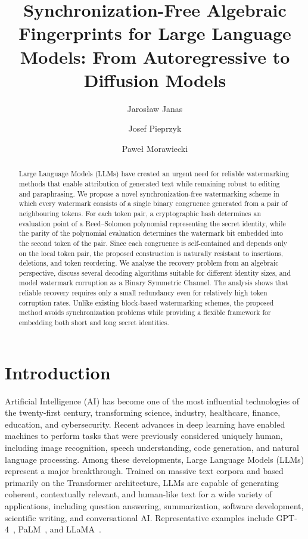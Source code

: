 \documentclass[a4paper,11pt]{llncs}
\title{Synchronization-Free Algebraic Fingerprints for Large Language Models: 
From Autoregressive to Diffusion Models}
\begin{document}
\pagestyle{headings}
\renewcommand{\labelitemi}{$\bullet$}
\author{
Jaros\l{}aw Janas \and
Josef Pieprzyk \and
Pawe\l{} Morawiecki 
}
\maketitle

\begin{abstract}
Large Language Models (LLMs) have created an urgent need for reliable watermarking methods that enable attribution of generated text while remaining robust to editing and paraphrasing. We propose a novel synchronization-free watermarking scheme in which every watermark consists of a single binary congruence generated from a pair of neighbouring tokens. For each token pair, a cryptographic hash determines an evaluation point of a Reed--Solomon polynomial representing the secret identity, while the parity of the polynomial evaluation determines the watermark bit embedded into the second token of the pair. Since each congruence is self-contained and depends only on the local token pair, the proposed construction is naturally resistant to insertions, deletions, and token reordering. We analyse the recovery problem from an algebraic perspective, discuss several decoding algorithms suitable for different identity sizes, and model watermark corruption as a Binary Symmetric Channel. The analysis shows that reliable recovery requires only a small redundancy even for relatively high token corruption rates. Unlike existing block-based watermarking schemes, the proposed method avoids synchronization problems while providing a flexible framework for embedding both short and long secret identities.
\end{abstract}


\section{Introduction}

Artificial Intelligence (AI) has become one of the most influential technologies of the twenty-first century, transforming science, industry, healthcare, finance, education, and cybersecurity. Recent advances in deep learning have enabled machines to perform tasks that were previously considered uniquely human, including image recognition, speech understanding, code generation, and natural language processing. Among these developments, Large Language Models (LLMs) represent a major breakthrough. Trained on massive text corpora and based primarily on the Transformer architecture, LLMs are capable of generating coherent, contextually relevant, and human-like text for a wide variety of applications, including question answering, summarization, software development, scientific writing, and conversational AI. Representative examples include GPT-4~\cite{openai2023gpt4}, PaLM~\cite{chowdhery_2022}, and LLaMA~\cite{touvron_2023}.
\end{document}
